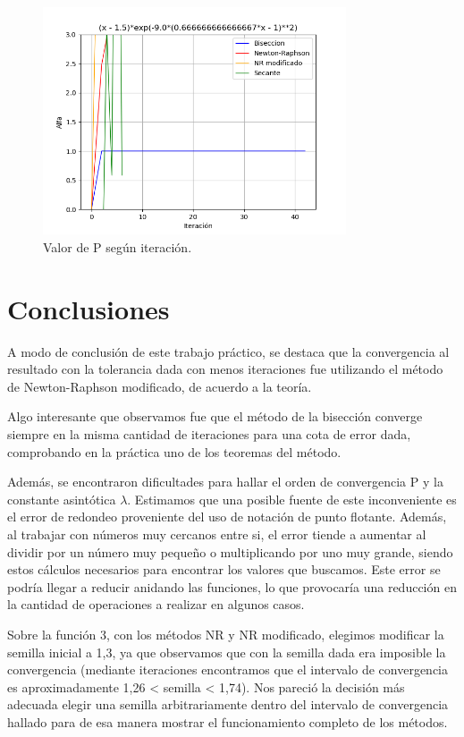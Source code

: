 \documentclass[titlepage,a4paper]{article}
\begin{document}
\begin{figure}[H]
    \centering
    \includegraphics[width=0.8\textwidth]{alfa f3.png}
    \caption{\label{fig:class01}Valor de P según iteración.}
\end{figure}


\newpage

\section{Conclusiones}\label{sec:conclusiones}

A modo de conclusión de este trabajo práctico, se destaca que la convergencia al resultado con la tolerancia dada con menos iteraciones fue utilizando el método de Newton-Raphson modificado, de acuerdo a la teoría. 

Algo interesante que observamos fue que el método de la bisección converge siempre en la misma cantidad de iteraciones para una cota de error dada, comprobando en la práctica uno de los teoremas del método.

Además, se encontraron dificultades para hallar el orden de convergencia P y la constante asintótica $\lambda$. Estimamos que una posible fuente de este inconveniente es el error de redondeo proveniente del uso de notación de punto flotante. Además, al trabajar con números muy cercanos entre si, el error tiende a aumentar al dividir por un número muy pequeño o multiplicando por uno muy grande, siendo estos cálculos necesarios para encontrar los valores que buscamos. Este error se podría llegar a reducir anidando las funciones, lo que provocaría una reducción en la cantidad de operaciones a realizar en algunos casos.
 
Sobre la función 3, con los métodos NR y NR modificado, elegimos modificar la semilla inicial a 1,3, ya que observamos que con la semilla dada era imposible la convergencia (mediante iteraciones encontramos que el intervalo de convergencia es aproximadamente 1,26 < semilla < 1,74). Nos pareció la decisión más adecuada elegir una semilla arbitrariamente dentro del intervalo de convergencia hallado para de esa manera mostrar el funcionamiento completo de los métodos.
\end{document}
